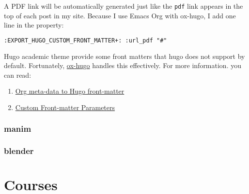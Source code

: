 A PDF link will be automatically generated just like the \texttt{pdf} link appears in
the top of each post in my site. Because I use Emacs Org with ox-hugo, I add one
line in the property:

\begin{verbatim}
:EXPORT_HUGO_CUSTOM_FRONT_MATTER+: :url_pdf "#"
\end{verbatim}

Hugo academic theme provide some front matters that hugo does not support by
default. Fortunately, \href{https://github.com/kaushalmodi/ox-hugo}{ox-hugo} handles this effectively. For more information.
you can read:
\begin{enumerate}
\item \href{https://ox-hugo.scripter.co/doc/org-meta-data-to-hugo-front-matter/}{Org meta-data to Hugo front-matter}
\item \href{https://ox-hugo.scripter.co/doc/custom-front-matter/}{Custom Front-matter Parameters}
\end{enumerate}


\subsubsection{manim}
\label{sec:org00574e3}



\subsubsection{blender}
\label{sec:orgbef2b43}

\section{Courses}
\label{sec:orgeb1cbcd}
